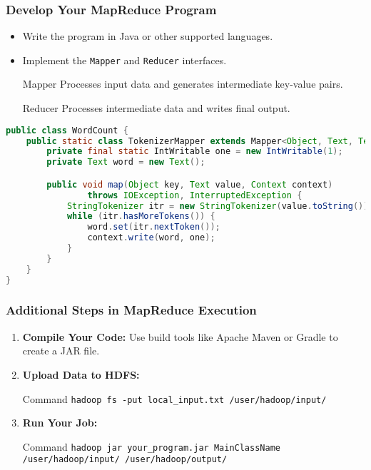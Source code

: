 \documentclass[aspectratio=169]{beamer}
\begin{document}
\begin{frame}[fragile]
    \frametitle{Develop Your MapReduce Program}
    \begin{itemize}
        \item Write the program in Java or other supported languages.
        \item Implement the \texttt{Mapper} and \texttt{Reducer} interfaces.
        \begin{block}{Mapper}
            Processes input data and generates intermediate key-value pairs.
        \end{block}
        \begin{block}{Reducer}
            Processes intermediate data and writes final output.
        \end{block}
    \end{itemize}
    \begin{lstlisting}[language=Java]
public class WordCount {
    public static class TokenizerMapper extends Mapper<Object, Text, Text, IntWritable> {
        private final static IntWritable one = new IntWritable(1);
        private Text word = new Text();

        public void map(Object key, Text value, Context context) 
                throws IOException, InterruptedException {
            StringTokenizer itr = new StringTokenizer(value.toString());
            while (itr.hasMoreTokens()) {
                word.set(itr.nextToken());
                context.write(word, one);
            }
        }
    }
}
    \end{lstlisting}
\end{frame}

\begin{frame}[fragile]
    \frametitle{Additional Steps in MapReduce Execution}
    \begin{enumerate}
        \item \textbf{Compile Your Code:} 
            Use build tools like Apache Maven or Gradle to create a JAR file.
        \item \textbf{Upload Data to HDFS:}
            \begin{block}{Command}
            \texttt{hadoop fs -put local\_input.txt /user/hadoop/input/}
            \end{block}
        \item \textbf{Run Your Job:}
            \begin{block}{Command}
            \texttt{hadoop jar your\_program.jar MainClassName /user/hadoop/input/ /user/hadoop/output/}
            \end{block}
    \end{enumerate}
\end{frame}
\end{document}
